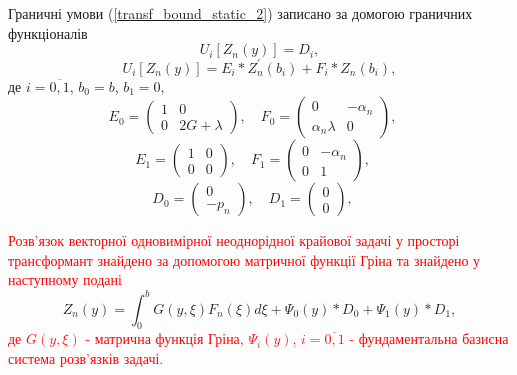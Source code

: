 Граничні умови (\ref{transf_bound_static_2}) записано за домогою граничних функціоналів
\begin{equation}\label{transf_bound_mat_static_2}
    U_i\left[ Z_n(y) \right] = D_i,
\end{equation}
\begin{equation}
    U_i\left[ Z_n(y) \right] = E_i * Z_n^{'}(b_i) + F_i * Z_n(b_i),
\end{equation}
де $i = \overline{0, 1}$, $b_0 = b$, $b_1 = 0$,
\begin{equation*}
    E_0 = \begin{pmatrix}
        1 & 0 \\
        0 & 2G + \lambda
    \end{pmatrix}, \quad
    F_0 = \begin{pmatrix}
        0 & -\alpha_n \\
        \alpha_n \lambda & 0
    \end{pmatrix}, \quad
\end{equation*}
\begin{equation*}
    E_1 = \begin{pmatrix}
        1 & 0 \\
        0 & 0
    \end{pmatrix}, \quad
    F_1 = \begin{pmatrix}
        0 & -\alpha_n \\
        0 & 1
    \end{pmatrix}, \quad
\end{equation*}
\begin{equation*}
    D_0 = \begin{pmatrix}
        0 \\
        -p_n
    \end{pmatrix}, \quad
    D_1 = \begin{pmatrix}
        0 \\
        0
    \end{pmatrix}, \quad
\end{equation*}

\textcolor{red}
{
Розв'язок векторної одновимірної неоднорідної крайової задачі у просторі трансформант знайдено за допомогою матричної функції Гріна
та знайдено у наступному подані \cite{popov_2}
}
\begin{equation}\label{transf_gen_sol_static_2}
    Z_n(y) = \int_0^b G(y,\xi) F_n(\xi) d\xi + \Psi_0(y) * D_0 + \Psi_1(y) * D_1,
\end{equation}
\textcolor{red}
{
де $G(y,\xi)$ - матрична функція Гріна, $\Psi_i(y)$, $i=\overline{0, 1}$ - фундаментальна базисна система розв'язків задачі.
}

